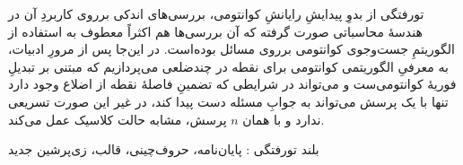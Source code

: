 


\pagestyle{empty}

‌تورفتگی
از بدوِ پیدایشِ رایانشِ کوانتومی، بررسی‌های اندکی برروی کاربردِ 
آن در هندسهٔ محاسباتی صورت گرفته که آن بررسی‌ها هم اکثراً 
معطوف به استفاده از الگوریتمِ جست‌وجوی کوانتومی برروی مسائل بوده‌است.
در این‌جا پس از مرورِ ادبیات، به معرفیِ الگوریتمی کوانتومی برای 
نقطه در چندضلعی می‌پردازیم که مبتنی بر تبدیلِ فوریهٔ کوانتومی‌ست 
و می‌تواند در  شرایطی که تضمینِ فاصلهٔ نقطه از اضلاع وجود دارد تنها با یک 
پرسش می‌تواند به جوابِ مسئله دست پیدا کند، در غیر این صورت تسریعی
ندارد و با همان $n$ پرسش، مشابه حالت کلاسیک عمل می‌کند.

‌بلند
‌تورفتگی : 
پایان‌نامه، حروف‌چینی، قالب، زی‌پرشین
‌جدید
